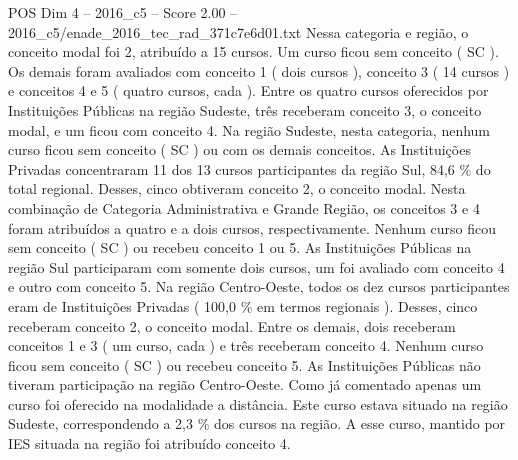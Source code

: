\begin{textsample}{POS Dim 4 – 2016\_c5 – Score 2.00 – 2016\_c5/enade\_2016\_tec\_rad\_371c7e6d01.txt}
Nessa categoria e região, o conceito modal foi 2, atribuído a 15 cursos.
Um curso ficou sem conceito ( SC ).
Os demais foram avaliados com conceito 1 ( dois cursos ), conceito 3 ( 14 cursos ) e conceitos 4 e 5 ( quatro cursos, cada ).
Entre os quatro cursos oferecidos por Instituições Públicas na região Sudeste, três receberam conceito 3, o conceito modal, e um ficou com conceito 4.
Na região Sudeste, nesta categoria, nenhum curso ficou sem conceito ( SC ) ou com os demais conceitos.
As Instituições Privadas concentraram 11 dos 13 cursos participantes da região Sul, 84,6 \% do total regional.
Desses, cinco obtiveram conceito 2, o conceito modal.
Nesta combinação de Categoria Administrativa e Grande Região, os conceitos 3 e 4 foram atribuídos a quatro e a dois cursos, respectivamente.
Nenhum curso ficou sem conceito ( SC ) ou recebeu conceito 1 ou 5.
As Instituições Públicas na região Sul participaram com somente dois cursos, um foi avaliado com conceito 4 e outro com conceito 5.
Na região Centro-Oeste, todos os dez cursos participantes eram de Instituições Privadas ( 100,0 \% em termos regionais ).
Desses, cinco receberam conceito 2, o conceito modal.
Entre os demais, dois receberam conceitos 1 e 3 ( um curso, cada ) e três receberam conceito 4.
Nenhum curso ficou sem conceito ( SC ) ou recebeu conceito 5.
As Instituições Públicas não tiveram participação na região Centro-Oeste.
Como já comentado apenas um curso foi oferecido na modalidade a distância.
Este curso estava situado na região Sudeste, correspondendo a 2,3 \% dos cursos na região.
A esse curso, mantido por IES situada na região foi atribuído conceito 4.

\end{textsample}
